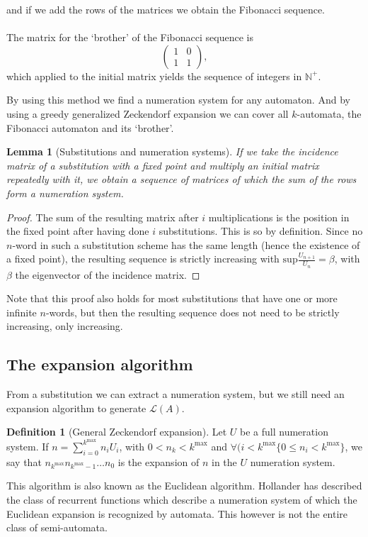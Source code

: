 \documentclass{article}
\newtheorem{lemma}[theorem]{Lemma}
\theoremstyle{definition}
\newtheorem{definition}[theorem]{Definition}
\begin{document}
and if we add the rows of the matrices we obtain the Fibonacci sequence.\\
\\
The matrix for the `brother' of the Fibonacci sequence is
\begin{displaymath} \left( \begin{array}{cc}
1 & 0\\
1 & 1
\end{array} \right), \end{displaymath}
which applied to the initial matrix yields the sequence of integers in 
$\mathbb{N}^+$.

By using this method we find a numeration system for any automaton. And by 
using a greedy generalized Zeckendorf expansion we can cover all $k$-automata, 
the Fibonacci automaton and its `brother'.

\begin{lemma}[Substitutions and numeration systems] \label{lem:subst-numsys}
If we take the incidence matrix of a substitution with a fixed point and
multiply an initial matrix repeatedly with it, we obtain a sequence of matrices
of which the sum of the rows form a numeration system.
\end{lemma}

\begin{proof}
The sum of the resulting matrix after $i$ multiplications is the position in 
the fixed point after having done $i$ substitutions. This is so by definition.
Since no $n$-word in such a substitution scheme has the same length (hence the
existence of a fixed point), the resulting sequence is strictly increasing with
$\mathrm{sup}\frac{U_{n + 1}}{U_n} = \beta$, with $\beta$ the eigenvector of
the incidence matrix.
\end{proof}

Note that this proof also holds for most substitutions that have one or more
infinite $n$-words, but then the resulting sequence does not need to be 
strictly increasing, only increasing.

\subsection{The expansion algorithm}
From a substitution we can extract a numeration system, but we still need an
expansion algorithm to generate $\mathcal{L}(A)$. 

\begin{definition}[General Zeckendorf expansion] \label{def:greedy}
Let $U$ be a full numeration system. If 
$n = \sum_{i = 0}^{k^{\mathrm{max}}} n_i U_i$, with 
$0 < n_k < k^{\mathrm{max}}$ and 
$\forall (i < k^{\mathrm{max}} \{0 \le n_i < k^{\mathrm{max}}\}$, we say that
$n_{k^{\mathrm{max}}} n_{k^{\mathrm{max}} - 1} \ldots n_0$ is the expansion of
$n$ in the $U$ numeration system.
\end{definition}
This algorithm is also known as the Euclidean algorithm. Hollander \cite{Hol}
has described the class of recurrent functions which describe a numeration
system of which the Euclidean expansion is recognized by automata. This however
is not the entire class of semi-automata.
\end{document}
